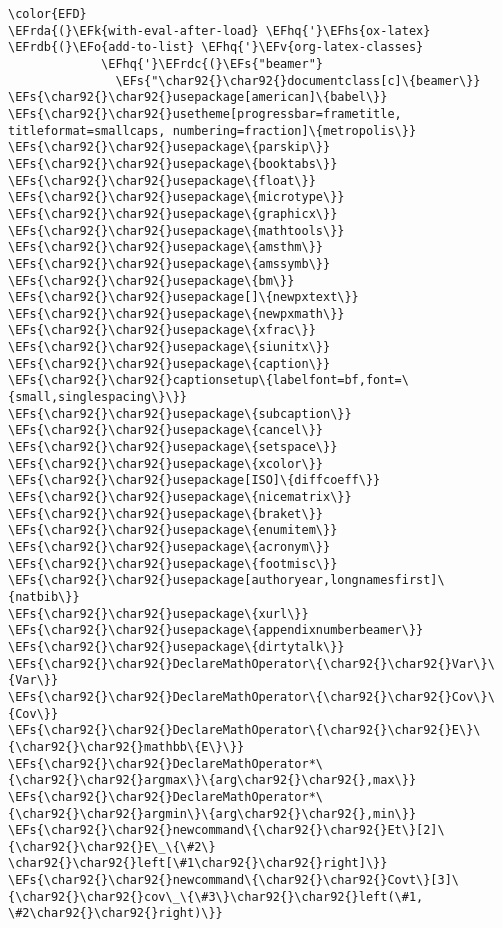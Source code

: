 \documentclass[12pt]{article}
\theoremstyle{plain}%
\theoremstyle{definition}
\theoremstyle{remark}
\newcommand{\EFs}[1]{\textcolor{EFs}{#1}} %
\newcommand{\EFk}[1]{\textcolor{EFk}{#1}} %
\newcommand{\EFv}[1]{\textcolor{EFv}{#1}} %
\newcommand{\EFo}[1]{\textcolor{EFo}{#1}} %
\newcommand{\EFhq}[1]{\textcolor{EFhq}{#1}} %
\newcommand{\EFhs}[1]{\textcolor{EFhs}{#1}} %
\newcommand{\EFrda}[1]{\textcolor{EFrda}{#1}} %
\newcommand{\EFrdb}[1]{\textcolor{EFrdb}{#1}} %
\newcommand{\EFrdc}[1]{\textcolor{EFrdc}{#1}} %
\begin{document}
\begin{Code}
\begin{Verbatim}
\color{EFD}
\EFrda{(}\EFk{with-eval-after-load} \EFhq{'}\EFhs{ox-latex}
\EFrdb{(}\EFo{add-to-list} \EFhq{'}\EFv{org-latex-classes}
             \EFhq{'}\EFrdc{(}\EFs{"beamer"}
               \EFs{"\char92{}\char92{}documentclass[c]\{beamer\}}
\EFs{\char92{}\char92{}usepackage[american]\{babel\}}
\EFs{\char92{}\char92{}usetheme[progressbar=frametitle, titleformat=smallcaps, numbering=fraction]\{metropolis\}}
\EFs{\char92{}\char92{}usepackage\{parskip\}}
\EFs{\char92{}\char92{}usepackage\{booktabs\}}
\EFs{\char92{}\char92{}usepackage\{float\}}
\EFs{\char92{}\char92{}usepackage\{microtype\}}
\EFs{\char92{}\char92{}usepackage\{graphicx\}}
\EFs{\char92{}\char92{}usepackage\{mathtools\}}
\EFs{\char92{}\char92{}usepackage\{amsthm\}}
\EFs{\char92{}\char92{}usepackage\{amssymb\}}
\EFs{\char92{}\char92{}usepackage\{bm\}}
\EFs{\char92{}\char92{}usepackage[]\{newpxtext\}}
\EFs{\char92{}\char92{}usepackage\{newpxmath\}}
\EFs{\char92{}\char92{}usepackage\{xfrac\}}
\EFs{\char92{}\char92{}usepackage\{siunitx\}}
\EFs{\char92{}\char92{}usepackage\{caption\}}
\EFs{\char92{}\char92{}captionsetup\{labelfont=bf,font=\{small,singlespacing\}\}}
\EFs{\char92{}\char92{}usepackage\{subcaption\}}
\EFs{\char92{}\char92{}usepackage\{cancel\}}
\EFs{\char92{}\char92{}usepackage\{setspace\}}
\EFs{\char92{}\char92{}usepackage\{xcolor\}}
\EFs{\char92{}\char92{}usepackage[ISO]\{diffcoeff\}}
\EFs{\char92{}\char92{}usepackage\{nicematrix\}}
\EFs{\char92{}\char92{}usepackage\{braket\}}
\EFs{\char92{}\char92{}usepackage\{enumitem\}}
\EFs{\char92{}\char92{}usepackage\{acronym\}}
\EFs{\char92{}\char92{}usepackage\{footmisc\}}
\EFs{\char92{}\char92{}usepackage[authoryear,longnamesfirst]\{natbib\}}
\EFs{\char92{}\char92{}usepackage\{xurl\}}
\EFs{\char92{}\char92{}usepackage\{appendixnumberbeamer\}}
\EFs{\char92{}\char92{}usepackage\{dirtytalk\}}
\EFs{\char92{}\char92{}DeclareMathOperator\{\char92{}\char92{}Var\}\{Var\}}
\EFs{\char92{}\char92{}DeclareMathOperator\{\char92{}\char92{}Cov\}\{Cov\}}
\EFs{\char92{}\char92{}DeclareMathOperator\{\char92{}\char92{}E\}\{\char92{}\char92{}mathbb\{E\}\}}
\EFs{\char92{}\char92{}DeclareMathOperator*\{\char92{}\char92{}argmax\}\{arg\char92{}\char92{},max\}}
\EFs{\char92{}\char92{}DeclareMathOperator*\{\char92{}\char92{}argmin\}\{arg\char92{}\char92{},min\}}
\EFs{\char92{}\char92{}newcommand\{\char92{}\char92{}Et\}[2]\{\char92{}\char92{}E\_\{\#2\} \char92{}\char92{}left[\#1\char92{}\char92{}right]\}}
\EFs{\char92{}\char92{}newcommand\{\char92{}\char92{}Covt\}[3]\{\char92{}\char92{}cov\_\{\#3\}\char92{}\char92{}left(\#1, \#2\char92{}\char92{}right)\}}

\end{Verbatim}
\end{Code}
\end{document}
